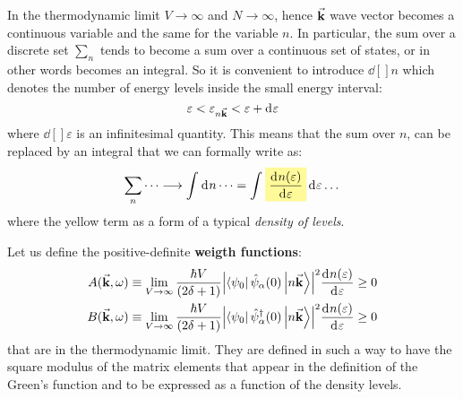 \documentclass[../main/main.tex]{subfiles}
\begin{document}
In the thermodynamic limit  \( V \rightarrow \infty  \) and \( N \rightarrow \infty  \), 
 hence \( \va{k} \) wave vector becomes  a continuous variable and the same for the variable \( n \). In particular, the sum over a discrete set \( \sum_{n}^{}   \) tends to become a sum over a continuous set of states, or in other words becomes an integral. So it is convenient to introduce \( \dd[]{n}  \) which denotes the number of energy levels inside the small energy interval:
\begin{equation*}
  \varepsilon < \varepsilon _{n \va{k}} < \varepsilon  + \dd[]{\varepsilon }
\end{equation*}
where \( \dd[]{\varepsilon }  \) is an infinitesimal quantity.
This means that the sum over \( n \), can be replaced by an integral that we can formally write as:
\begin{equation*}
  \sum_{n}^{} \dots \longrightarrow \int_{}^{} \dd[]{n} \dots =
  \int_{}^{} \mathcolorbox{yellow!40}{\frac{\dd[]{n(\varepsilon )} }{\dd[]{\varepsilon } }}\dd[]{\varepsilon } \dots
\end{equation*}
where the yellow term as a form of a typical \emph{density of levels}.

Let us define the positive-definite \textbf{weigth functions}: 
\begin{subequations}
\begin{align}
  A (\va{k}, \omega ) & \equiv  \lim_{V \rightarrow \infty } \frac{\hbar V}{(2 \delta +1)} \abs{\bra{\psi _0} \hat{\psi }_ \alpha (0) \ket{n \va{k}}   }^2  \frac{\dd[]{n(\varepsilon )} }{\dd[]{\varepsilon } } \ge 0 \label{eq:10_01}  \\
  B (\va{k}, \omega ) & \equiv  \lim_{V \rightarrow \infty } \frac{\hbar V}{(2 \delta +1)} \abs{\bra{\psi _0} \hat{\psi }_ \alpha ^\dag  (0) \ket{n \va{k}}   }^2  \frac{\dd[]{n(\varepsilon )} }{\dd[]{\varepsilon } } \ge 0 \label{eq:10_02}
\end{align}
\end{subequations}
that are in the thermodynamic limit. They are defined in such a way to have the square modulus of the matrix elements that appear in the definition of the Green's function and to be expressed as a function of the density levels.
\end{document}
